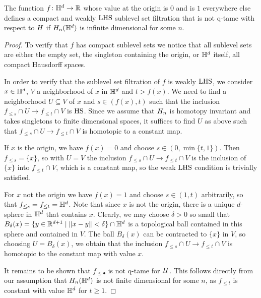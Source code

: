 \begin{thm} \label{t:counterexample}
	The function $f \colon \mathbb{H}^d \to \mathbb{R}$ whose value at the origin is $0$ and is $1$ everywhere else defines a compact and weakly $\mathrm{LHS}$ sublevel set filtration that is not q-tame with respect to $H$ if $H_{n}(\mathbb{H}^d)$ is infinite dimensional for some $n$.
\end{thm}

\begin{proof}
	To verify that $f$ has compact sublevel sets we notice that all sublevel sets are either the empty set, the singleton containing the origin, or $\mathbb{H}^d$ itself, all compact Hausdorff spaces.

	In order to verify that the sublevel set filtration of $f$ is weakly $\mathrm{LHS}$, we
	consider $x \in \mathbb{H}^d$, $V$ a neighborhood of $x$ in $\mathbb{H}^d$ and $t > f(x)$. We need to find a neighborhood $U \subseteq V$ of $x$ and $s \in (f(x), t)$ such that the inclusion $f_{\leq s} \cap U \to f_{\leq t} \cap V$ is $\mathrm{HS}$. Since we assume that $H_{n}$ is homotopy invariant and takes singletons to finite dimensional spaces, it suffices to find $U$ as above such that $f_{\leq s} \cap U \to f_{\leq t} \cap V$ is homotopic to a constant map.

	If $x$ is the origin, we have $f(x) = 0$ and choose $s \in (0, \min\{t, 1\})$.
	Then $f_{\leq s} = \{x\}$, so with $U = V$ the inclusion $f_{\leq s} \cap U \to f_{\leq t} \cap V$ is the inclusion of $\{x\}$ into $f_{\leq t} \cap V$, which is a constant map, so the weak $\mathrm{LHS}$ condition is trivially satisfied.

	For $x$ not the origin we have $f(x) = 1$ and choose $s \in (1,t)$ arbitrarily, so that $f_{\leq s} = f_{\leq t} = \mathbb{H}^d$.
	Note that since $x$ is not the origin, there is a unique $d$-sphere in $\mathbb{H}^d$ that contains $x$.
	Clearly, we may choose $\delta > 0$ so small that $B_{\delta}(x) = \{y \in \mathbb{R}^{d+1} \mid \Vert x - y \Vert < \delta\} \cap \mathbb{H}^d$ is a topological ball contained in this sphere and contained in $V$.
	The ball $B_\delta(x)$ can be contracted to $\{x\}$ in $V$, so choosing $U = B_{\delta}(x)$, we obtain that the inclusion $f_{\leq s} \cap U \to f_{\leq t} \cap V$ is homotopic to the constant map with value $x$.

	It remains to be shown that $f_{\leq \bullet}$ is not q-tame for $H$.
	This follows directly from our assumption that $H_{n}(\mathbb{H}^d)$ is not finite dimensional for some $n$, as $f_{\leq t}$ is constant with value $\mathbb{H}^d$ for $t \geq 1$.
\end{proof}

